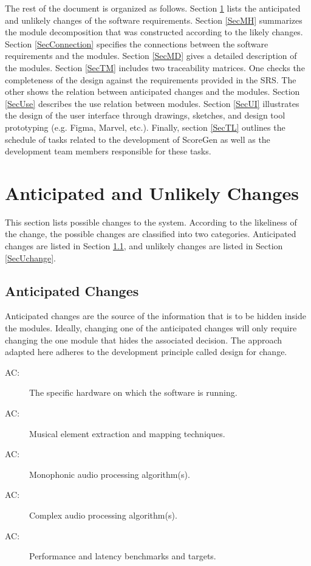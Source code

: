 \documentclass[12pt, titlepage]{article}
\newcounter{acnum}
\newcommand{\actheacnum}{AC\theacnum}
\begin{document}
The rest of the document is organized as follows. Section
\ref{SecChange} lists the anticipated and unlikely changes of the software
requirements. Section \ref{SecMH} summarizes the module decomposition that
was constructed according to the likely changes. Section \ref{SecConnection}
specifies the connections between the software requirements and the
modules. Section \ref{SecMD} gives a detailed description of the
modules. Section \ref{SecTM} includes two traceability matrices. One checks
the completeness of the design against the requirements provided in the SRS. The
other shows the relation between anticipated changes and the modules. Section
\ref{SecUse} describes the use relation between modules. Section \ref{SecUI} illustrates the design 
of the user interface through drawings, sketches, and design tool prototyping 
(e.g. Figma, Marvel, etc.). Finally, section \ref{SecTL} outlines the schedule 
of tasks related to the development of ScoreGen as well as the development team 
members responsible for these tasks.

\section{Anticipated and Unlikely Changes} \label{SecChange}

This section lists possible changes to the system. According to the likeliness
of the change, the possible changes are classified into two
categories. Anticipated changes are listed in Section \ref{SecAchange}, and
unlikely changes are listed in Section \ref{SecUchange}.

\subsection{Anticipated Changes} \label{SecAchange}

Anticipated changes are the source of the information that is to be hidden
inside the modules. Ideally, changing one of the anticipated changes will only
require changing the one module that hides the associated decision. The approach
adapted here adheres to the development principle called design for change.

\begin{description}
  \item[ \actheacnum \label{acHardware}:] The specific hardware on which the software is running.
  \item[ \actheacnum \label{acExtractionMapping}:] Musical element extraction and mapping techniques.
  \item[ \actheacnum \label{acMonophonic}:] Monophonic audio processing algorithm(s).
  \item[ \actheacnum \label{acComplex}:] Complex audio processing algorithm(s).
  \item[ \actheacnum \label{acPerformance}:] Performance and latency benchmarks and targets.
\end{description}
  
\end{document}
